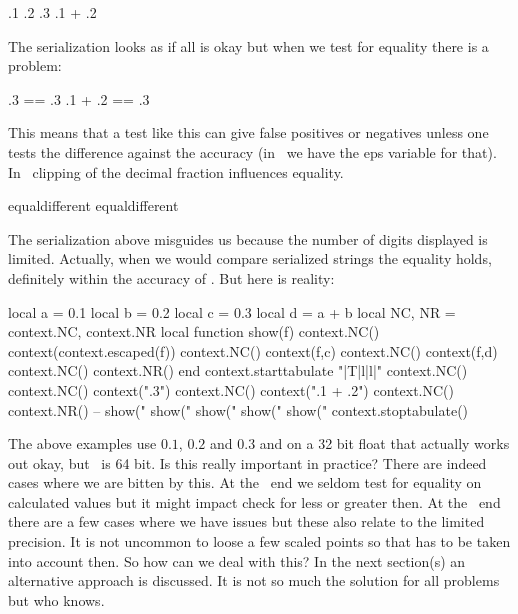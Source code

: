 \starttabulate[|Tr|r|]
\NC .1      \NC {}  \NC \NR
\NC .2      \NC {}  \NC \NR
\NC .3      \NC {}  \NC \NR
\NC .1 + .2 \NC {}  \NC \NR
\stoptabulate

The serialization looks as if all is okay but when we test for equality there
is a problem:

\starttabulate[|Tr|l|]
\NC      .3 == .3 \NC {} \NC \NR
\NC .1 + .2 == .3 \NC {} \NC \NR
\stoptabulate

This means that a test like this can give false positives or negatives unless one
tests the difference against the accuracy (in \METAPOST\ we have the {eps}
variable for that). In \TEX\ clipping of the decimal fraction influences equality.

\starttabulate[|Tr|l|]
\NC {} \NC {} equal\else different\fi \NC \NR
\NC {} \NC {} equal\else different\fi \NC \NR
\stoptabulate

The serialization above misguides us because the number of digits displayed is
limited. Actually, when we would compare serialized strings the equality holds,
definitely within the accuracy of \TEX. But here is reality:

\startluacode
    local a = 0.1
    local b = 0.2
    local c = 0.3
    local d = a + b
    local NC, NR = context.NC, context.NR
    local function show(f)
        context.NC() context(context.escaped(f))
        context.NC() context(f,c)
        context.NC() context(f,d)
        context.NC() context.NR()
    end
    context.starttabulate { "|T|l|l|" }
        context.NC()
        context.NC() context(".3")
        context.NC() context(".1 + .2")
        context.NC() context.NR()
     -- show("%
        show("%
        show("%
        show("%
        show("%
    context.stoptabulate()
\stopluacode

The above examples use $0.1$, $0.2$ and $0.3$ and on a 32 bit float that actually
works out okay, but \LUAMETATEX\ is 64 bit. Is this really important in practice?
There are indeed cases where we are bitten by this. At the \LUA\ end we seldom
test for equality on calculated values but it might impact check for less or
greater then. At the \TEX\ end there are a few cases where we have issues but
these also relate to the limited precision. It is not uncommon to loose a few
scaled points so that has to be taken into account then. So how can we deal with
this? In the next section(s) an alternative approach is discussed. It is not so
much the solution for all problems but who knows.

